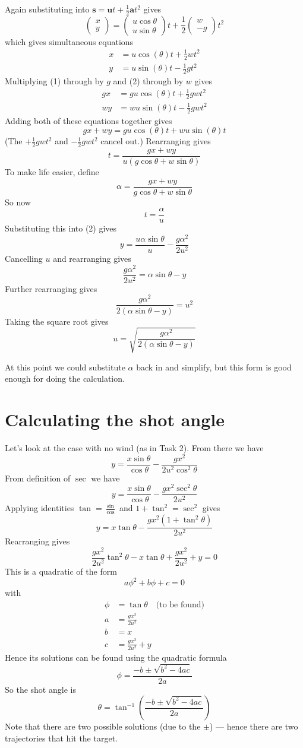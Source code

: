 \documentclass{article}
\newcommand{\colvec}[2]{\begin{pmatrix}#1\\#2\end{pmatrix}}
\begin{document}
Again substituting into $\mathbf{s} = \mathbf{u}t + \frac12\mathbf{a}t^2$ gives
$$ \colvec{x}{y} = \colvec{u\cos\theta}{u\sin\theta} t + \frac12 \colvec{w}{-g} t^2 $$
which gives simultaneous equations
\begin{align}
    x &= u \cos(\theta) t + \frac12 w t^2 \tag{1} \\
    y &= u \sin(\theta) t - \frac12 g t^2 \tag{2}
\end{align}
Multiplying (1) through by $g$ and (2) through by $w$ gives
\begin{align}
    gx &= gu \cos(\theta) t + \frac12 gw t^2 \\
    wy &= wu \sin(\theta) t - \frac12 gw t^2
\end{align}
Adding both of these equations together gives
$$ gx + wy = gu \cos(\theta) t + wu \sin(\theta) t $$
(The $+\frac12 gw t^2$ and $-\frac12 gw t^2$ cancel out.)
Rearranging gives
$$ t = \frac{gx + wy}{u(g\cos\theta + w\sin\theta)} $$
To make life easier, define
$$ \alpha = \frac{gx + wy}{g\cos\theta + w\sin\theta} $$
So now 
$$ t = \frac{\alpha}{u} $$
Substituting this into (2) gives
$$ y = \frac{u \alpha \sin\theta}{u} - \frac{g \alpha^2}{2 u^2} $$
Cancelling $u$ and rearranging gives
$$ \frac{g \alpha^2}{2 u^2} = \alpha \sin\theta - y $$
Further rearranging gives
$$ \frac{g \alpha^2}{2 (\alpha \sin\theta - y)} = u^2 $$
Taking the square root gives
$$ u = \sqrt{\frac{g \alpha^2}{2 (\alpha \sin\theta - y)}} $$

At this point we could substitute $\alpha$ back in and simplify, but this form is good enough for doing the calculation.

\section{Calculating the shot angle}

Let's look at the case with no wind (as in Task 2). From there we have
$$ y = \frac{x \sin\theta}{\cos\theta} - \frac{g x^2}{2 u^2 \cos^2 \theta} $$
From definition of $\sec$ we have
$$ y = \frac{x \sin\theta}{\cos\theta} - \frac{g x^2 \sec^2\theta}{2 u^2} $$
Applying identities $\tan = \frac{\sin}{\cos}$ and $1 + \tan^2 = \sec^2$ gives
$$ y = x \tan\theta - \frac{g x^2 (1 + \tan^2\theta)}{2 u^2} $$
Rearranging gives
$$ \frac{g x^2}{2 u^2} \tan^2 \theta - x \tan\theta + \frac{g x^2}{2 u^2} + y = 0 $$
This is a quadratic of the form
$$ a \phi^2 + b \phi + c = 0 $$
with
\begin{align*}
    \phi &= \tan\theta \quad\text{(to be found)} \\
    a &= \frac{g x^2}{2 u^2} \\
    b &= x \\
    c &= \frac{g x^2}{2 u^2} + y
\end{align*}
Hence its solutions can be found using the quadratic formula
$$ \phi = \frac{-b \pm \sqrt{b^2 - 4ac}}{2a} $$
So the shot angle is
$$ \theta = \tan^{-1}\left( \frac{-b \pm \sqrt{b^2 - 4ac}}{2a} \right) $$
Note that there are two possible solutions (due to the $\pm$) --- hence there are two trajectories that hit the target.
\end{document}
